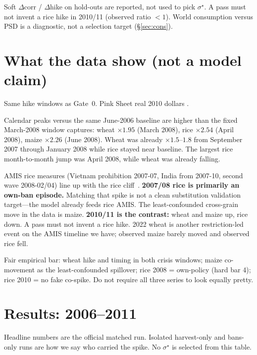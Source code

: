 \documentclass[11pt,a4paper]{article}
\begin{document}
Soft \(\Delta\)corr / \(\Delta\)hike on hold-outs are reported, not used
to pick \(\sigma^\star\). A pass must not invent a rice hike in 2010/11
(observed ratio \(<1\)). World consumption versus PSD is a diagnostic, not
a selection target (\S\ref{sec:cons}).

\section{What the data show (not a model claim)}
\label{sec:data}

Same hike windows as Gate~0. Pink Sheet real 2010 dollars
\citep{worldbank_pink}.

\begin{table}[H]
\centering
\caption{Observed hike ratios. Source: Pink Sheet, MUV 2010\$.}
\label{tab:pink}
\small

\end{table}

Calendar peaks versus the same June-2006 baseline are higher than the
fixed March-2008 window captures: wheat \(\times 1.95\) (March 2008), rice
\(\times 2.54\) (April 2008), maize \(\times 2.26\) (June 2008). Wheat was
already \(\times 1.5\)--\(1.8\) from September 2007 through January 2008
while rice stayed near baseline. The largest rice month-to-month jump was
April 2008, while wheat was already falling.

AMIS rice measures (Vietnam prohibition 2007-07, India from 2007-10,
second wave 2008-02/04) line up with the rice cliff~\citep{amis_oecd}.
\textbf{2007/08 rice is primarily an own-ban episode.} Matching that spike
is not a clean substitution validation target---the model already feeds
rice AMIS. The least-confounded cross-grain move in the data is maize.
\textbf{2010/11 is the contrast:} wheat and maize up, rice down. A pass
must not invent a rice hike. 2022 wheat is another restriction-led event
on the AMIS timeline we have; observed maize barely moved and observed
rice fell.

Fair empirical bar: wheat hike and timing in both crisis windows; maize
co-movement as the least-confounded spillover; rice 2008 = own-policy
(hard bar 4); rice 2010 = no fake co-spike. Do not require all three
series to look equally pretty.

\section{Results: 2006--2011}
\label{sec:results}

Headline numbers are the official matched run. Isolated harvest-only and
bans-only runs are how we say who carried the spike. No \(\sigma^\star\)
is selected from this table.
\end{document}
